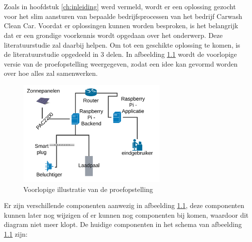 \chapter{}%
\label{ch:stand-van-zaken}



Zoals in hoofdstuk \ref{ch:inleiding} werd vermeld, wordt er een oplossing gezocht voor het slim aansturen van bepaalde bedrijfsprocessen van het bedrijf Carwash Clean Car. Voordat er oplossingen kunnen worden besproken, is het belangrijk dat er een grondige voorkennis wordt opgedaan over het onderwerp. Deze literatuurstudie zal daarbij helpen. Om tot een geschikte oplossing te komen, is de literatuurstudie opgedeeld in 3 delen. In afbeelding \ref{fig:voorlopige-proefopstelling} wordt de voorlopige versie van de proefopstelling weergegeven, zodat een idee kan gevormd worden over hoe alles zal samenwerken.

\begin{figure}[h!]
    \centering
    \includegraphics[width=20em]{./graphics/voorlopige-proefopstelling.png}
    \caption{Voorlopige illustratie van de proefopstelling}
    \label{fig:voorlopige-proefopstelling}
\end{figure}

Er zijn verschillende componenten aanwezig in afbeelding \ref{fig:voorlopige-proefopstelling}, deze componenten kunnen later nog wijzigen of er kunnen nog componenten bij komen, waardoor dit diagram niet meer klopt. De huidige componenten in het schema van afbeelding \ref{fig:voorlopige-proefopstelling} zijn:

